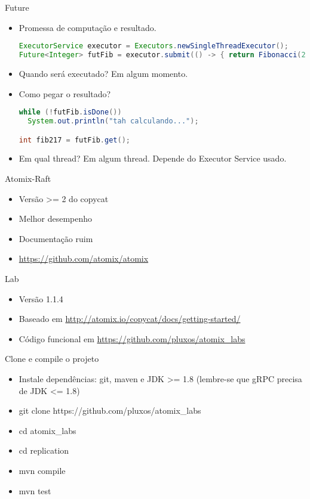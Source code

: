 \begin{frame}[fragile]{Future}
\begin{itemize}
	\item Promessa de computação e resultado.
\begin{lstlisting}[language=java]
ExecutorService executor = Executors.newSingleThreadExecutor();
Future<Integer> futFib = executor.submit(() -> { return Fibonacci(217)};
\end{lstlisting}

	\item Quando será executado? \pause Em algum momento.
	\item Como pegar o resultado? 

\begin{lstlisting}[language=java]
while (!futFib.isDone())
  System.out.println("tah calculando...");

int fib217 = futFib.get();
\end{lstlisting}

	\item Em qual thread? \pause Em algum thread. Depende do Executor Service usado.	
\end{itemize}
\end{frame}


\begin{frame}{Atomix-Raft}
\begin{itemize}
	\item Versão >= 2 do copycat
	\item Melhor desempenho
	\item Documentação ruim
	\item \url{https://github.com/atomix/atomix}
\end{itemize}
\end{frame}

\begin{frame}{Lab}
\begin{itemize}
	\item Versão 1.1.4
	\item Baseado em \url{http://atomix.io/copycat/docs/getting-started/}
	\item Código funcional em \url{https://github.com/pluxos/atomix_labs}
\end{itemize}
\end{frame}

\begin{frame}{Clone e compile o projeto}
\begin{itemize}
	\item Instale dependências: git, maven e JDK >= 1.8 (lembre-se que gRPC precisa de JDK <= 1.8)
	\item git clone https://github.com/pluxos/atomix\_labs
	\item cd atomix\_labs
	\item cd replication
	\item mvn compile
	\item mvn test
\end{itemize}
\end{frame}

